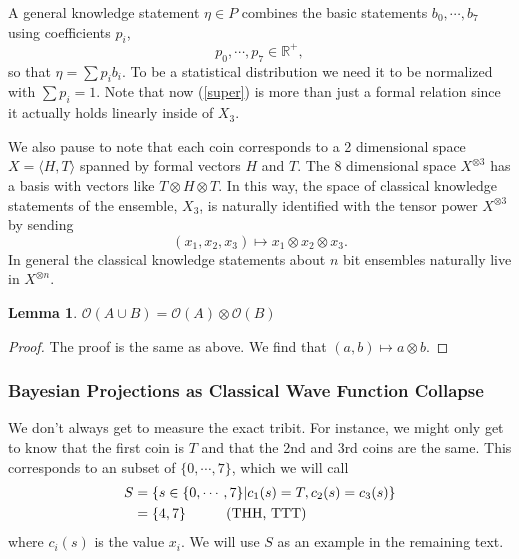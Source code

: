 \documentclass[12pt,a4paper]{article}
\theoremstyle{myrule}
\newtheorem{lemma}[theorem]{Lemma}
\begin{document}
A general knowledge statement $\eta \in P$ combines the basic statements $b_0, \cdots, b_7$ using coefficients $p_i$,
\[
  p_0,\cdots,p_{7} \in \mathbb{R}^+,
\]
so that $\eta = \sum p_i b_i$.  To be a statistical distribution we need it to be normalized with $\sum p_i = 1$.  Note that now (\ref{super}) is more than just a formal relation since it actually holds linearly inside of $X_3$.

We also  pause to note that each coin corresponds to a 2 dimensional space $X = \langle H, T \rangle$ spanned by formal vectors $H$ and $T$.  The 8 dimensional space $X ^ {\otimes 3}$ has a basis with vectors like $T \otimes H \otimes T$.  In this way, the space of classical knowledge statements of the ensemble, $X_3$, is naturally identified with the tensor power $X^{\otimes 3}$ by sending
\[
(x_1,x_2,x_3) \mapsto x_1 \otimes x_2 \otimes x_3.
\]
In general the classical knowledge statements about $n$ bit ensembles naturally live in $X ^ {\otimes n}$.
\begin{lemma}
  $\mathcal{O}(A \cup B) = \mathcal{O}(A) \otimes \mathcal{O}(B)$
\end{lemma}
\begin{proof}
  The proof is the same as above.  We find that $(a,b) \mapsto a \otimes b.$
\end{proof}

\subsubsection{Bayesian Projections as Classical Wave Function Collapse}
\label{proj}
We don't always get to measure the exact tribit.  For instance, we might only get to know that the first coin is $T$ and that the 2nd and 3rd coins are the same.  This corresponds to an subset of $\{0,\cdots,7\}$, which we will call
\[
\begin{split}
  S &= \{s \in \{0,\cdots,7\} | c_1(s) = T, c_2(s) = c_3(s) \} \\
    & = \{4,7\} \hspace{0.4 in} \text{(THH, TTT)}
\end{split}
\]
where $c_i(s)$ is the value $x_i$.  We will use $S$ as an example in the remaining text.
\end{document}
